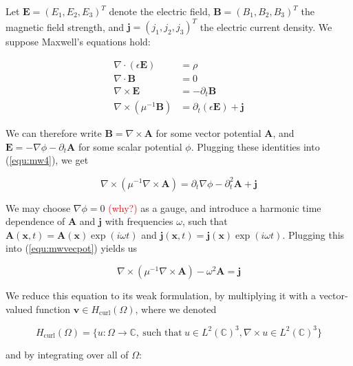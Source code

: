 \documentclass[11pt, a4paper]{article}
\begin{document}
Let $\mathbf{E} = (E_1, E_2, E_3)^T$ denote the electric field,
$\mathbf{B} = (B_1, B_2, B_3)^T$ the magnetic field strength, and 
$\mathbf{j} = (j_1, j_2, j_3)^T$ the electric current density. 
We suppose Maxwell's equations hold:

\begin{align}
    \nabla \cdot (\epsilon \mathbf{E}) &= \rho \\
    \nabla \cdot \mathbf{B} &= 0 \\
    \nabla \times \mathbf{E} &= -\partial_t \mathbf{B} \\
    \nabla \times (\mu^{-1} \mathbf{B}) &= \partial_t (\epsilon \mathbf{E}) + \mathbf{j} \label{equ:mw4}
\end{align}

We can therefore write $\mathbf{B} = \nabla \times \mathbf{A}$ for some vector
potential $\mathbf{A}$, and $\mathbf{E} = -\nabla \phi - \partial_t \mathbf{A}$ for some
scalar potential $\phi$. Plugging these identities into (\ref{equ:mw4}), we get 

\begin{equation}
    \nabla \times (\mu^{-1} \nabla \times \mathbf{A}) = \partial_t \nabla \phi -
    \partial_t^2 \mathbf{A} + \mathbf{j} \label{equ:mwvecpot}
\end{equation}

We may choose $\nabla \phi = 0$ \textcolor{red}{(why?)} as a gauge, and introduce a harmonic time dependence
of $\mathbf{A}$ and $\mathbf{j}$ with frequencies $\omega$, such that $\mathbf{A}(\mathbf{x}, t) = 
\mathbf{A}(\mathbf{x})\exp(i \omega t)$ and $\mathbf{j}(\mathbf{x}, t) = 
\mathbf{j}(\mathbf{x})\exp(i \omega t)$. Plugging this into (\ref{equ:mwvecpot})
yields us

\begin{equation}
    \nabla \times (\mu^{-1} \nabla \times \mathbf{A}) - \omega^2 \mathbf{A} = \mathbf{j} \label{equ:mwtimeharm}
\end{equation}

We reduce this equation to its weak formulation, by multiplying it with a vector-valued 
function $\mathbf{v} \in H_{\text{curl}}(\Omega)$, where we denoted

\begin{equation}
    H_{\text{curl}}(\Omega) = \{u : \Omega \to \mathbb{C}, ~\text{such that}~ u \in L^2(\mathbb{C})^3,
    \nabla \times u \in L^2(\mathbb{C})^3 \}
\end{equation}

and by integrating over all of $\Omega$:
\end{document}
